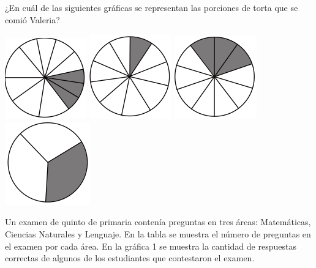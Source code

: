 \documentclass[10pt,addpoints]{exam}
\begin{document}
\begin{multicols}{2}
\begin{questions}
¿En cuál de las siguientes gráficas se representan las porciones de torta que se comió Valeria?
\begin{choices}
\choice \includegraphics[scale=.5]{Images/Pantallazo-24.png} 
\choice \includegraphics[scale=.5]{Images/Pantallazo-25.png} 
\CorrectChoice \includegraphics[scale=.5]{Images/Pantallazo-26.png} 
\choice \includegraphics[scale=.5]{Images/Pantallazo-27.png} 
\end{choices}
\question Un examen de quinto de primaria contenía preguntas en tres áreas: Matemáticas, Ciencias Naturales y Lenguaje. En la tabla se muestra el número de preguntas en el examen por cada área. En la gráfica 1 se muestra la cantidad de respuestas correctas de algunos de los estudiantes que contestaron el examen.


\end{questions}
\end{multicols}
\end{document}
